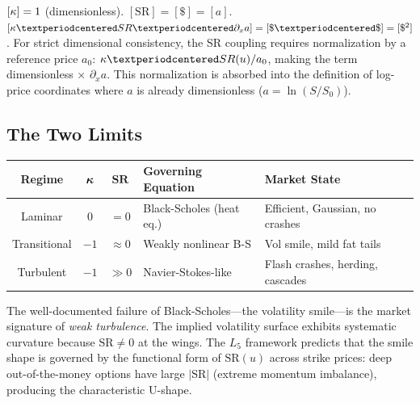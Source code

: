 \begin{remark}
$[\kappa] = 1$ (dimensionless). $[\mathrm{SR}] = [\$] = [a]$. $[\kap \cdot \mathrm{SR} \cdot \partial_x a] = [\$ \cdot \$] = [\$^2]$. For strict dimensional consistency, the SR coupling requires normalization by a reference price $a_0$: $\kap \cdot \mathrm{SR}(u)/a_0$, making the term dimensionless $\times$ $\partial_x a$. This normalization is absorbed into the definition of log-price coordinates where $a$ is already dimensionless ($a = \ln(S/S_0)$). \checkmark
\end{remark}

\subsection{The Two Limits}

\begin{center}
\begin{tabular}{@{}cccll@{}}
\toprule
\textbf{Regime} & $\boldsymbol{\kappa}$ & $\mathbf{SR}$ & \textbf{Governing Equation} & \textbf{Market State} \\
\midrule
Laminar & $0$ & $= 0$ & Black-Scholes (heat eq.) & Efficient, Gaussian, no crashes \\
Transitional & $-1$ & $\approx 0$ & Weakly nonlinear B-S & Vol smile, mild fat tails \\
Turbulent & $-1$ & $\gg 0$ & Navier-Stokes-like & Flash crashes, herding, cascades \\
\bottomrule
\end{tabular}
\end{center}

\begin{remark}
The well-documented failure of Black-Scholes---the volatility smile---is the market signature of \emph{weak turbulence}. The implied volatility surface exhibits systematic curvature because $\mathrm{SR} \neq 0$ at the wings. The $L_5$ framework predicts that the smile shape is governed by the functional form of $\mathrm{SR}(u)$ across strike prices: deep out-of-the-money options have large $|\mathrm{SR}|$ (extreme momentum imbalance), producing the characteristic U-shape.
\end{remark}

